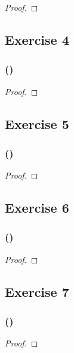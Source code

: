 \documentclass[14pt]{extarticle}
\begin{document}
\begin{proof}

\end{proof}

\subsection{Exercise 4}

\subsubsection{()}

\begin{proof}

\end{proof}

\subsection{Exercise 5}

\subsubsection{()}

\begin{proof}

\end{proof}

\subsection{Exercise 6}

\subsubsection{()}

\begin{proof}

\end{proof}

\subsection{Exercise 7}

\subsubsection{()}

\begin{proof}

\end{proof}
\end{document}
